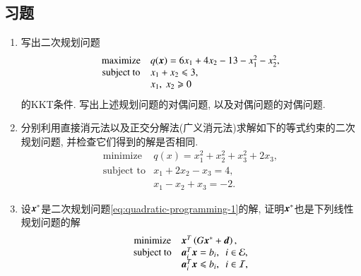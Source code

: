 \subsection*{习题}

\begin{enumerate}

\item 写出二次规划问题
\begin{equation*}
\begin{array}{cl}
\text{maximize} & q({\bm{x}}) = 6x_1 + 4x_2 - 13 - x_1^2 - x_2^2, \\
\text{subject to} & x_1 + x_2 \leqslant 3, \\
& x_1, ~ x_2 \geqslant 0
\end{array}
\end{equation*}
的KKT条件. 写出上述规划问题的对偶问题, 以及对偶问题的对偶问题.

\item 分别利用直接消元法以及正交分解法(广义消元法)求解如下的等式约束的二次规划问题, 并检查它们得到的解是否相同.
\begin{equation*}
\begin{array}{cl}
\text{minimize} & q(x) = x_1^2 + x_2^2 + x_3^2 + 2x_3, \\
\text{subject to} & x_1 + 2x_2 - x_3 = 4, \\
& x_1 - x_2 + x_3 = -2.
\end{array}
\end{equation*}

\item 设${\bm{x}}^*$是二次规划问题\eqref{eq:quadratic-programming-1}的解, 证明${\bm{x}}^*$也是下列线性规划问题的解
\begin{equation*}
\begin{array}{cl}
\text{minimize} & {\bm{x}}^T \left( G {\bm{x}}^* + {\bm{d}} \right), \\
\text{subject to} & {\bm{a}}_i^T {\bm{x}} = b_i, ~~ i \in \mathcal{E}, \\
& {\bm{a}}_i^T {\bm{x}} \leqslant b_i, ~~ i \in \mathcal{I},
\end{array}
\end{equation*}


\end{enumerate}
